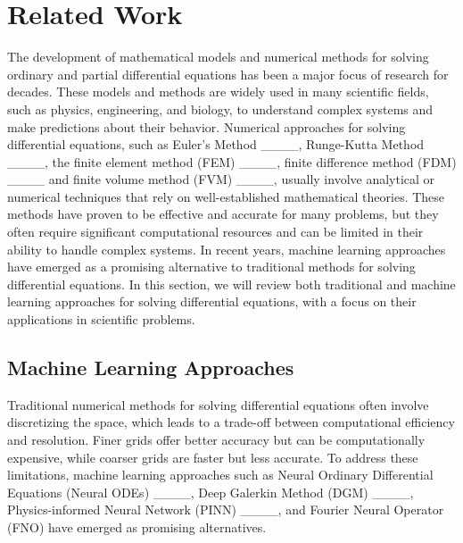 \section{Related Work}
The development of mathematical models and numerical methods for solving ordinary and partial differential equations has been a major focus of research for decades. These models and methods are widely used in many scientific fields, such as physics, engineering, and biology, to understand complex systems and make predictions about their behavior. Numerical approaches for solving differential equations, such as Euler's Method ____, Runge-Kutta Method ____, the finite element method (FEM) ____, finite difference method (FDM) ____ and finite volume method (FVM) ____, usually involve analytical or numerical techniques that rely on well-established mathematical theories.
These methods have proven to be effective and accurate for many problems, but they often require significant computational resources and can be limited in their ability to handle complex systems. In recent years, machine learning approaches have emerged as a promising alternative to traditional methods for solving differential equations. In this section, we will review both traditional and machine learning approaches for solving differential equations, with a focus on their applications in scientific problems.


\subsection{Machine Learning Approaches}

Traditional numerical methods for solving differential equations often involve discretizing the space, which leads to a trade-off between computational efficiency and resolution. Finer grids offer better accuracy but can be computationally expensive, while coarser grids are faster but less accurate. To address these limitations, machine learning approaches such as Neural Ordinary Differential Equations (Neural ODEs) ____, Deep Galerkin Method (DGM) ____, Physics-informed Neural Network (PINN) ____, and Fourier Neural Operator (FNO) have emerged as promising alternatives.

